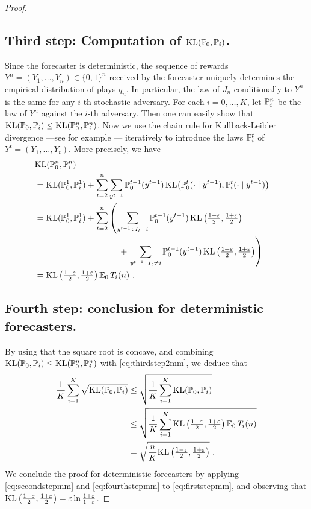 \begin{proof}
\subsection*{Third step: Computation of $\K(\P_{0}, \P_{i})$.
}
%
Since the forecaster is deterministic, the sequence of rewards $Y^n = (Y_1,\hdots,Y_n) \in \{0,1\}^n$ received by the forecaster uniquely determines the empirical distribution of plays $q_n$. In particular, the law of $J_n$ conditionally to $Y^n$ is the same for any $i$-th stochastic adversary. For each $i=0, \hdots, K$, let $\P_i^n$ be the law of $Y^n$ against the $i$-th adversary. Then one can easily show that 
$
\K(\P_{0}, \P_{i}) \leq \K(\P_{0}^n, \P_{i}^n)
$.
Now we use the chain rule for Kullback-Leibler divergence ---see for example \cite[Section A.2]{CL06}--- iteratively to introduce the laws $\P^t_i$ of $Y^t=(Y_1, \hdots, Y_t)$. More precisely, we have
%
\begin{align}
\lefteqn{\K(\P_{0}^n, \P_{i}^n)} \notag \\
& = \K(\P_0^1, \P_i^1) + \sum_{t=2}^n \sum_{y^{t-1}} \P_0^{t-1}(y^{t-1})\,\K\bigl(\P_{0}^t(\cdot\mid y^{t-1}),\P_{i}^t(\cdot\mid y^{t-1})\bigr) \notag \\
& = \K(\P_0^1, \P_i^1) + \sum_{t=2}^n \left( \sum_{y^{t-1} \,:\, I_t = i} \P_0^{t-1}(y^{t-1})\,\K\left(\tfrac{1-\epsilon}{2},\tfrac{1+\epsilon}{2}\right) \right. \notag \\
&\qquad\qquad\qquad\qquad\qquad
+ \left. \sum_{y^{t-1} \,:\, I_t \neq i} \P_0^{t-1}(y^{t-1})\,\K\left(\tfrac{1+\epsilon}{2}, \tfrac{1+\epsilon}{2}\right)\right) \notag \\
& = \K\left(\tfrac{1-\epsilon}{2}, \tfrac{1+\epsilon}{2} \right) \E_0\,T_{i}(n)~. \label{eq:thirdstep2mm}
\end{align}
%
\subsection*{Fourth step: conclusion for deterministic forecasters.
}
%
By using that the square root is concave, and combining $\K(\P_{0}, \P_{i}) \leq \K(\P_{0}^n, \P_{i}^n)$ with \eqref{eq:thirdstep2mm}, we deduce that
\begin{align}
\frac{1}{K} \sum_{i=1}^K \sqrt{\K(\P_{0},\P_{i})}& \leq \sqrt{\frac{1}{K} \sum_{i=1}^K \K(\P_{0},\P_{i})} \notag \\
& \leq \sqrt{\frac{1}{K} \sum_{i=1}^K \K\left(\tfrac{1-\epsilon}{2}, \tfrac{1+\epsilon}{2} \right) \E_0\,T_{i}(n)} \notag \\
& = \sqrt{\frac{n}{K} \K\left(\tfrac{1-\epsilon}{2}, \tfrac{1+\epsilon}{2} \right)}~. \label{eq:fourthstepmm}
\end{align}
We conclude the proof for deterministic forecasters by applying \eqref{eq:secondstepmm} and \eqref{eq:fourthstepmm} to \eqref{eq:firststepmm}, and observing that
$
\K\left(\tfrac{1-\epsilon}{2}, \tfrac{1+\epsilon}{2} \right) = 
\epsilon \ln\tfrac{1+\epsilon}{1-\epsilon}
$.


\end{proof}
